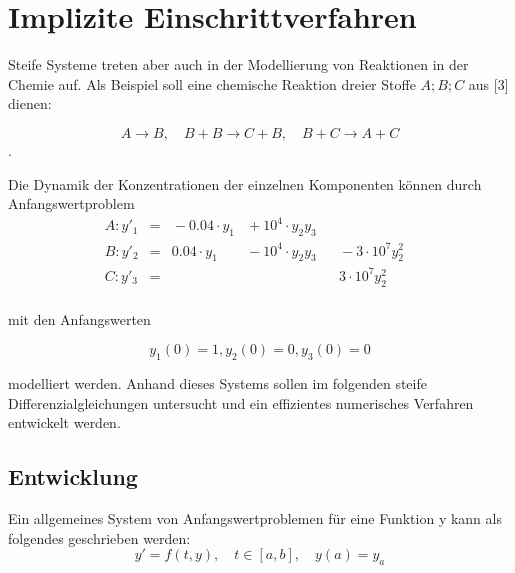 \chapter{Implizite Einschrittverfahren}

Steife Systeme treten aber auch in der Modellierung von Reaktionen in der Chemie auf. Als Beispiel soll
eine chemische Reaktion dreier Stoffe $A;B;C$ aus [3] dienen:

\begin{equation*}
	A \rightarrow B, \quad B + B \rightarrow C+ B, \quad B + C \rightarrow A + C
\end{equation*}. 

Die Dynamik der Konzentrationen der einzelnen Komponenten können durch Anfangswertproblem
\begin{align}\label{eq:matrix}
	A:y'_1&= &{}-0.04\cdot y_1  &{}+ 10^4\cdot y_2y_3& & &\\
	B:y'_2&= & 0.04\cdot y_1  &{}- 10^4\cdot y_2y_3& &{}- 3\cdot 10^7y_2^2 &\\
	C:y'_3&= &                  &                  &  & 3\cdot 10^7y_2^2 &\\
\end{align}




mit den Anfangswerten

\begin{equation*}
y_1(0) = 1, y_2(0) = 0, y_3(0) = 0
\end{equation*}  

modelliert werden. Anhand dieses Systems sollen im folgenden steife Differenzialgleichungen untersucht
und ein effizientes numerisches Verfahren entwickelt werden.

\section{Entwicklung}

Ein allgemeines System von Anfangswertproblemen für eine Funktion y kann als folgendes geschrieben werden:
\begin{equation}
	 y' = f(t,y) ,\quad t \in [a,b],\quad y(a) = y_a 
\end{equation}



